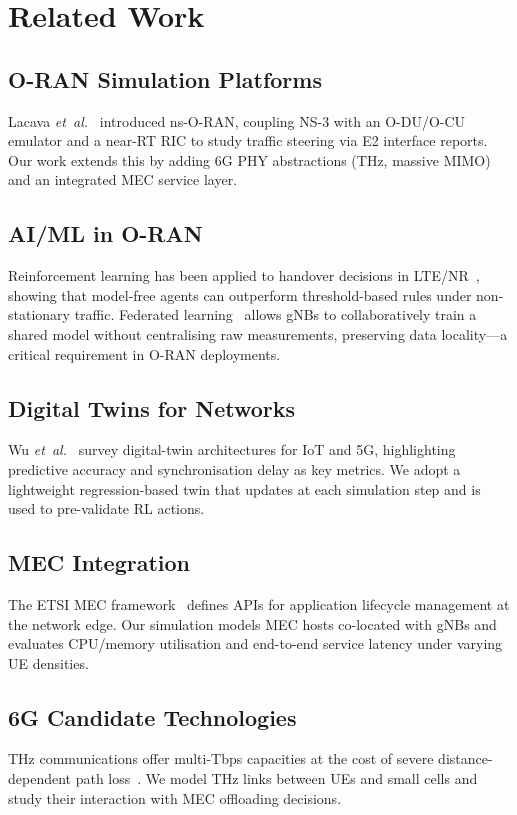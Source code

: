 \section{Related Work}
\label{sec:related}

\subsection{O-RAN Simulation Platforms}
Lacava \emph{et~al.}~\cite{ns3_oran2021} introduced ns-O-RAN, coupling NS-3
with an O-DU/O-CU emulator and a near-RT RIC to study traffic steering via
E2 interface reports.
Our work extends this by adding 6G PHY abstractions (THz, massive MIMO) and
an integrated MEC service layer.

\subsection{AI/ML in O-RAN}
Reinforcement learning has been applied to handover decisions in
LTE/NR~\cite{dqn_handover2020}, showing that model-free agents can
outperform threshold-based rules under non-stationary traffic.
Federated learning~\cite{fedavg2017} allows gNBs to collaboratively train
a shared model without centralising raw measurements, preserving data
locality---a critical requirement in O-RAN deployments.

\subsection{Digital Twins for Networks}
Wu \emph{et~al.}~\cite{digital_twin_net2022} survey digital-twin
architectures for IoT and 5G, highlighting predictive accuracy and
synchronisation delay as key metrics.
We adopt a lightweight regression-based twin that updates at each simulation
step and is used to pre-validate RL actions.

\subsection{MEC Integration}
The ETSI MEC framework~\cite{mec_etsi2022} defines APIs for application
lifecycle management at the network edge.
Our simulation models MEC hosts co-located with gNBs and evaluates CPU/memory
utilisation and end-to-end service latency under varying UE densities.

\subsection{6G Candidate Technologies}
THz communications offer multi-Tbps capacities at the cost of severe
distance-dependent path loss~\cite{thz_6g2022}.
We model THz links between UEs and small cells and study their interaction
with MEC offloading decisions.

